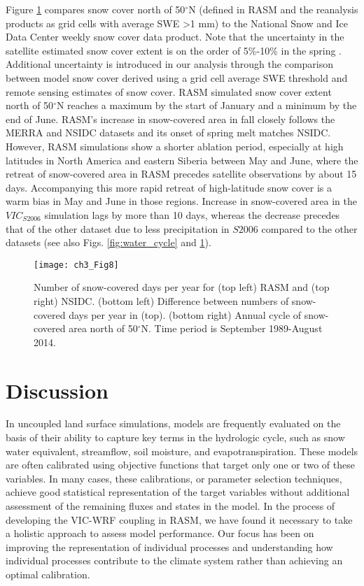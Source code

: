 Figure \ref{fig:snow} compares snow cover north of 50$^{\circ}$N (defined in RASM and the reanalysis products as grid cells with average SWE >1 mm) to the National Snow and Ice Data Center weekly snow cover data product.
Note that the uncertainty in the satellite estimated snow cover extent is on the order of 5\%-10\% in the spring \citep{Brown_2011}.
Additional uncertainty is introduced in our analysis through the comparison between model snow cover derived using a grid cell average SWE threshold and remote sensing estimates of snow cover.
RASM simulated snow cover extent north of 50$^{\circ}$N reaches a maximum by the start of January and a minimum by the end of June.
RASM's increase in snow-covered area in fall closely follows the MERRA and NSIDC datasets and its onset of spring melt matches NSIDC.
However, RASM simulations show a shorter ablation period, especially at high latitudes in North America and eastern Siberia between May and June, where the retreat of snow-covered area in RASM precedes satellite observations by about 15 days.
Accompanying this more rapid retreat of high-latitude snow cover is a warm bias in May and June in those regions.
Increase in snow-covered area in the $VIC_{S2006}$ simulation lags by more than 10 days, whereas the decrease precedes that of the other dataset due to less precipitation in $S2006$ compared to the other datasets (see also Figs.
\ref{fig:water_cycle} and \ref{fig:snow}).


\begin{figure}
  \centering
  \texttt{[image: ch3\_Fig8]}
  \caption{Number of snow-covered days per year for (top left) RASM and (top right) NSIDC.
  (bottom left) Difference between numbers of snow-covered days per year in (top).
  (bottom right) Annual cycle of snow-covered area north of 50$^{\circ}$N.
  Time period is September 1989-August 2014.}
  \label{fig:snow}
\end{figure}

\section{Discussion}
\label{sec:discussion_ch3}

In uncoupled land surface simulations, models are frequently evaluated on the basis of their ability to capture key terms in the hydrologic cycle, such as snow water equivalent, streamflow, soil moisture, and evapotranspiration.
These models are often calibrated using objective functions that target only one or two of these variables.
In many cases, these calibrations, or parameter selection techniques, achieve good statistical representation of the target variables without additional assessment of the remaining fluxes and states in the model.
In the process of developing the VIC-WRF coupling in RASM, we have found it necessary to take a holistic approach to assess model performance.
Our focus has been on improving the representation of individual processes and understanding how individual processes contribute to the climate system rather than achieving an optimal calibration.

